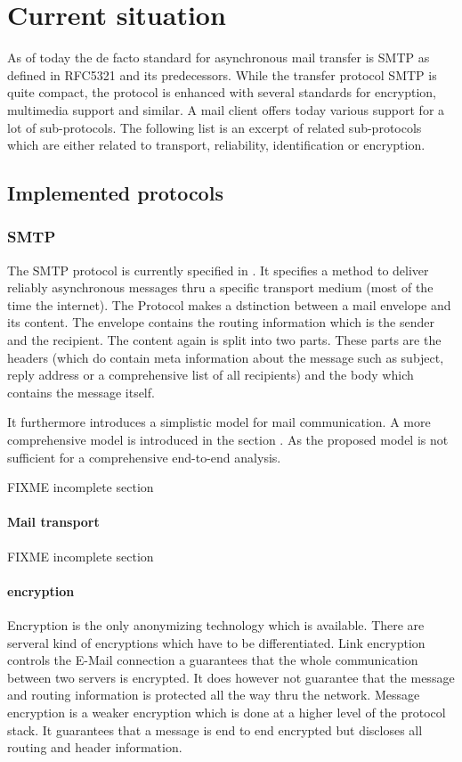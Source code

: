 \chapter{Current situation}
As of today the de facto standard for asynchronous mail transfer is SMTP as defined in RFC5321\cite{RFC5321} and its predecessors. While the transfer protocol SMTP is quite compact, the protocol is enhanced with several standards for encryption, multimedia support and similar. A mail client offers today various support for a lot of sub-protocols. The following list is an excerpt of related sub-protocols which are either related to transport, reliability, identification or encryption. 

\section{Implemented protocols}
\subsection{SMTP }
The SMTP protocol is currently specified in \cite{RFC5321}. It specifies a method to deliver reliably asynchronous messages thru a specific transport medium (most of the time the internet). The Protocol makes a dstinction between a mail envelope and its content. The envelope contains the routing information which is the sender and the recipient. The content again is split into two parts. These parts are the headers (which do contain meta information about the message such as subject, reply address or a comprehensive list of all recipients) and the body which contains the message itself.\par

It furthermore introduces a simplistic model for mail communication. A more comprehensive model is introduced in the section . As the proposed model is not sufficient for a comprehensive end-to-end analysis.\par



FIXME incomplete section

\subsubsection{Mail transport}
\cite{RFC1870}
FIXME incomplete section

\subsubsection{encryption}
Encryption is the only anonymizing technology which is available. There are serveral kind of encryptions which have to be differentiated. Link encryption controls the E-Mail connection a guarantees that the whole communication between two servers is encrypted. It does however not guarantee that the message and routing information is protected all the way thru the network. Message encryption is a weaker encryption which is done at a higher level of the protocol stack. It guarantees that a message is end to end encrypted but discloses all routing and header information.\par

